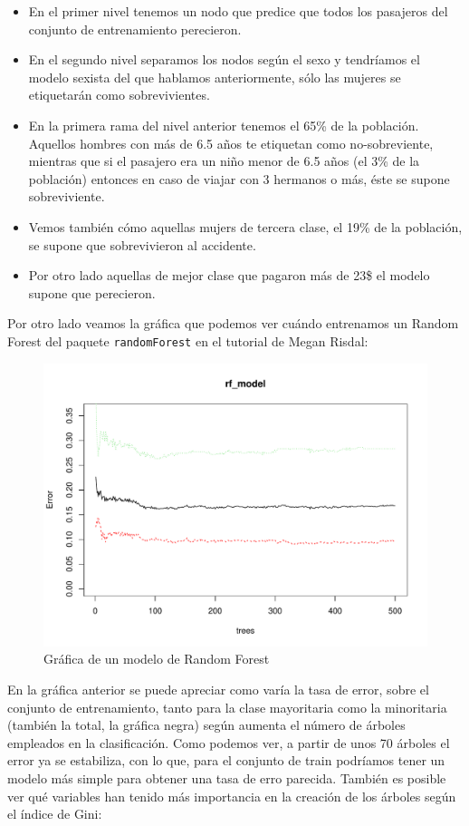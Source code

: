 \documentclass[10pt,a4paper]{article}
\newcommand{\code}[1]{\textcolor{rblue}{\texttt{#1}}} %
\begin{document}
\begin{itemize}
\item En el primer nivel tenemos un nodo que predice que todos los pasajeros del conjunto de entrenamiento perecieron.
\item En el segundo nivel separamos los nodos según el sexo y tendríamos el modelo sexista del que hablamos anteriormente, sólo las mujeres se etiquetarán como sobrevivientes.
\item En la primera rama del nivel anterior tenemos el 65\% de la población. Aquellos hombres con más de 6.5 años te etiquetan como no-sobreviente, mientras que si el pasajero era un niño menor de 6.5 años (el 3\% de la población) entonces en caso de viajar con 3 hermanos o más, éste se supone sobreviviente.
\item Vemos también cómo aquellas mujers de tercera clase, el 19\% de la población, se supone que sobrevivieron al accidente.
\item Por otro lado aquellas de mejor clase que pagaron más de 23\$ el modelo supone que perecieron.
\end{itemize}

Por otro lado veamos la gráfica que podemos ver cuándo entrenamos un Random Forest del paquete \code{randomForest} en el tutorial de Megan Risdal: 

\begin{figure}[H]
  \centering
  \includegraphics[width=\textwidth]{imgs/rf.pdf}
  \caption{Gráfica de un modelo de Random Forest}
\end{figure}

En la gráfica anterior se puede apreciar como varía la tasa de error, sobre el conjunto de entrenamiento, tanto para la clase mayoritaria como la minoritaria (también la total, la gráfica negra) según aumenta el número de árboles empleados en la clasificación. Como podemos ver, a partir de unos 70 árboles el error ya se estabiliza, con lo que, para el conjunto de train podríamos tener un modelo más simple para obtener una tasa de erro parecida. También es posible ver qué variables han tenido más importancia en la creación de los árboles según el índice de Gini:
\end{document}
